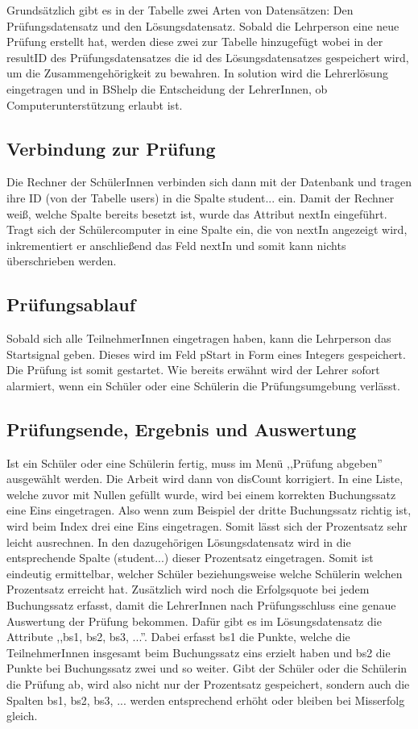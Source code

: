 \documentclass[12pt]{report}
\begin{document}
\noindent Grundsätzlich gibt es in der Tabelle zwei Arten von Datensätzen: Den Prüfungsdatensatz und den Lösungsdatensatz. Sobald die Lehrperson eine neue Prüfung erstellt hat, werden diese zwei zur Tabelle hinzugefügt wobei in der resultID des Prüfungsdatensatzes die id des Lösungsdatensatzes gespeichert wird, um die Zusammengehörigkeit zu bewahren. In solution wird die Lehrerlösung eingetragen und in BShelp die Entscheidung der LehrerInnen, ob Computerunterstützung erlaubt ist. 

\subsection{Verbindung zur Prüfung}

Die Rechner der SchülerInnen verbinden sich dann mit der Datenbank und tragen ihre ID (von der Tabelle users) in die Spalte student... ein. Damit der Rechner weiß, welche Spalte bereits besetzt ist, wurde das Attribut nextIn eingeführt. Tragt sich der Schülercomputer in eine Spalte ein, die von nextIn angezeigt wird, inkrementiert er anschließend das Feld nextIn und somit kann nichts überschrieben werden.

\subsection{Prüfungsablauf}

Sobald sich alle TeilnehmerInnen eingetragen haben, kann die Lehrperson das Startsignal geben. Dieses wird im Feld pStart in Form eines Integers gespeichert. Die Prüfung ist somit gestartet. Wie bereits erwähnt wird der Lehrer sofort alarmiert, wenn ein Schüler oder eine Schülerin die Prüfungsumgebung verlässt.

\subsection{Prüfungsende, Ergebnis und Auswertung}

Ist ein Schüler oder eine Schülerin fertig, muss im Menü ,,Prüfung abgeben'' ausgewählt werden. Die Arbeit wird dann von disCount korrigiert. In eine Liste, welche zuvor mit Nullen gefüllt wurde, wird bei einem korrekten Buchungssatz eine Eins eingetragen. Also wenn zum Beispiel der dritte Buchungssatz richtig ist, wird beim Index drei eine Eins eingetragen. Somit lässt sich der Prozentsatz sehr leicht ausrechnen. In den dazugehörigen Lösungsdatensatz wird in die entsprechende Spalte (student...) dieser Prozentsatz eingetragen. Somit ist eindeutig ermittelbar, welcher Schüler beziehungsweise welche Schülerin welchen Prozentsatz erreicht hat. Zusätzlich wird noch die Erfolgsquote bei jedem Buchungssatz erfasst, damit die LehrerInnen nach Prüfungsschluss eine genaue Auswertung der Prüfung bekommen. Dafür gibt es im Lösungsdatensatz die Attribute ,,bs1, bs2, bs3, ...''. Dabei erfasst bs1 die Punkte, welche die TeilnehmerInnen insgesamt beim Buchungssatz eins erzielt haben und bs2 die Punkte bei Buchungssatz zwei und so weiter. Gibt der Schüler oder die Schülerin die Prüfung ab, wird also nicht nur der Prozentsatz gespeichert, sondern auch die Spalten bs1, bs2, bs3, ... werden entsprechend erhöht oder bleiben bei Misserfolg gleich. 
\end{document}
